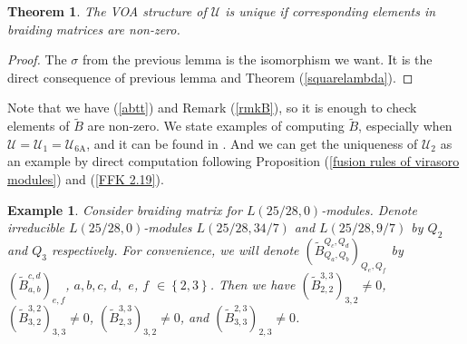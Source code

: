 \documentclass{article}
\newtheorem{theorem}[lemma]{Theorem}
\newtheorem{example}[lemma]{Example}
\begin{document}
\begin{theorem}\label{unique}
The VOA structure of $\mathcal{U}$ is unique 
if corresponding elements in braiding matrices are non-zero.
\end{theorem}
\begin{proof}
The $\sigma$ from the previous lemma is the isomorphism we want.
It is the direct consequence of previous lemma and Theorem (\ref{squarelambda}).
\end{proof}

Note that we have (\ref{abtt}) and Remark (\ref{rmkB}), 
so it is enough to check elements of $\tilde{B}$ are non-zero.
We state examples of computing $\tilde{B}$, 
especially when $\mathcal{U}=\mathcal{U}_1=\mathcal{U}_{\operatorname{6A}}$,
and it can be found in \cite{DJY}. And we can get the uniqueness of $\mathcal{U}_2$ as an example
by direct computation following Proposition (\ref{fusion rules of virasoro modules}) and (\ref{FFK 2.19}).

\begin{example}
Consider braiding matrix for $L\left(25/28,0\right)$-modules.
Denote irreducible $L\left(25/28,0\right)$-modules $L\left(25/28,34/7\right)$
and $L\left(25/28,9/7\right)$ by $Q_{2}$ and $Q_{3}$
respectively. For convenience, we will denote $\left(\tilde{B}_{Q_{a},Q_{b}}^{Q_{c},Q_{d}}\right)_{Q_{e},Q_{f}}$
by $\left(\tilde{B}_{a,b}^{c,d}\right)_{e,f}$, $a,b,c$, $d,$ $e$,
$f$ $\in\left\{ 2,3\right\} $. 
Then we have
\label{(2332)_3,2 nonzero} \label{(3322)_3,3 nonzero}
\label{(2333)_3,2 nonzero} \label{(3,2,3,3)_2,3 nonzero}$\left(\tilde{B}_{2,2}^{3,3}\right)_{3,2}\not=0$,
$\left(\tilde{B}_{3,2}^{3,2}\right)_{3,3}\not=0$, $\left(\tilde{B}_{2,3}^{3,3}\right)_{3,2}\not=0$,
and $\left(\tilde{B}_{3,3}^{2,3}\right)_{2,3}\not=0$.
\end{example}
\end{document}
